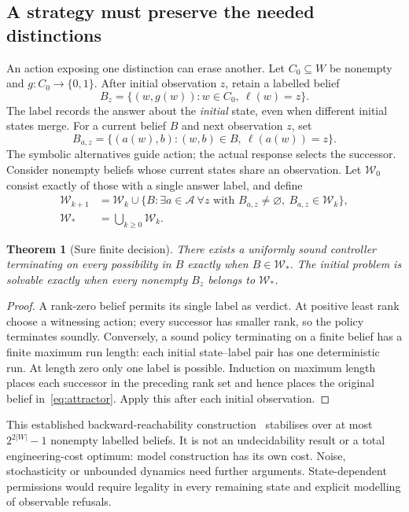 \documentclass[11pt]{article}
\newtheorem{theorem}{Theorem}
\newcommand{\cA}{\mathcal A}
\newcommand{\cW}{\mathcal W}
\begin{document}
\subsection{A strategy must preserve the needed distinctions}\label{sec:belief}
An action exposing one distinction can erase another. Let $C_0\subseteq W$ be nonempty and $g:C_0\to\{0,1\}$. After initial observation $z$, retain a labelled belief
\begin{equation}\label{eq:initialbelief}
B_z=\{(w,g(w)):w\in C_0,\ \ell(w)=z\}.
\end{equation}
The label records the answer about the \emph{initial} state, even when different initial states merge. For a current belief $B$ and next observation $z$, set
\begin{equation}\label{eq:beliefupdate}
B_{a,z}=\{(a(w),b):(w,b)\in B,\ \ell(a(w))=z\}.
\end{equation}
The symbolic alternatives guide action; the actual response selects the successor. Consider nonempty beliefs whose current states share an observation. Let $\cW_0$ consist exactly of those with a single answer label, and define
\begin{equation}\label{eq:attractor}
\begin{split}
\cW_{k+1}&=\cW_k\cup\{B:\exists a\in\cA\ \forall z\text{ with }B_{a,z}\ne\varnothing,\ B_{a,z}\in\cW_k\},\\
\cW_*&=\bigcup_{k\geq0}\cW_k.
\end{split}
\end{equation}
\begin{theorem}[Sure finite decision]\label{thm:decision}
There exists a uniformly sound controller terminating on every possibility in $B$ exactly when $B\in\cW_*$. The initial problem is solvable exactly when every nonempty $B_z$ belongs to $\cW_*$.
\end{theorem}
\begin{proof}
A rank-zero belief permits its single label as verdict. At positive least rank choose a witnessing action; every successor has smaller rank, so the policy terminates soundly. Conversely, a sound policy terminating on a finite belief has a finite maximum run length: each initial state--label pair has one deterministic run. At length zero only one label is possible. Induction on maximum length places each successor in the preceding rank set and hence places the original belief in~\eqref{eq:attractor}. Apply this after each initial observation.
\end{proof}
This established backward-reachability construction~\cite{bos} stabilises over at most $2^{2|W|}-1$ nonempty labelled beliefs. It is not an undecidability result or a total engineering-cost optimum: model construction has its own cost. Noise, stochasticity or unbounded dynamics need further arguments. State-dependent permissions would require legality in every remaining state and explicit modelling of observable refusals.
\end{document}
